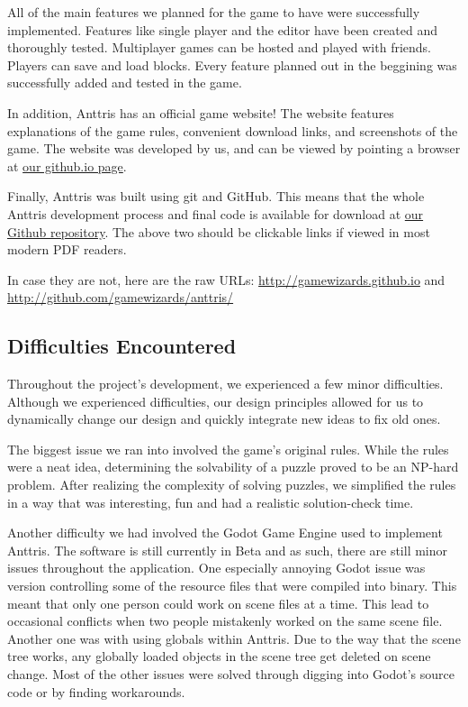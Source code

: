 \documentclass[12pt]{article}
\begin{document}
All of the main features we planned for the game to have were successfully implemented. Features like single player and the editor have been created and thoroughly tested. Multiplayer games can be hosted and played with friends. Players can save and load blocks. Every feature planned out in the beggining was successfully added and tested in the game.

In addition, Anttris has an official game website! The website features explanations of the game rules, convenient download links, and screenshots of the game. The website was developed by us, and can be viewed by pointing a browser at \href{http://gamewizards.github.io}{our github.io page}.


Finally, Anttris was built using git and GitHub. This means that the whole Anttris development process and final code is available for download at \href{http://github.com/gamewizards/anttris/}{our Github repository}. The above two should be clickable links if viewed in most modern PDF readers. 

In case they are not, here are the raw URLs: \url{http://gamewizards.github.io} and \url{http://github.com/gamewizards/anttris/}

\subsection{Difficulties Encountered} %
Throughout the project's development, we experienced a few minor difficulties. Although we experienced difficulties, our design principles allowed for us to dynamically change our design and quickly integrate new ideas to fix old ones.

The biggest issue we ran into involved the game's original rules. While the rules were a neat idea, determining the solvability of a puzzle proved to be an NP-hard problem. After realizing the complexity of solving puzzles, we simplified the rules in a way that was interesting, fun and had a realistic solution-check time.

Another difficulty we had involved the Godot Game Engine used to implement Anttris. The software is still currently in Beta and as such, there are still minor issues throughout the application. One especially annoying Godot issue was version controlling some of the resource files that were compiled into binary. This meant that only one person could work on scene files at a time. This lead to occasional conflicts when two people mistakenly worked on the same scene file. Another one was with using globals within Anttris. Due to the way that the scene tree works, any globally loaded objects in the scene tree get deleted on scene change. Most of the other issues were solved through digging into Godot's source code or by finding workarounds.
\end{document}
